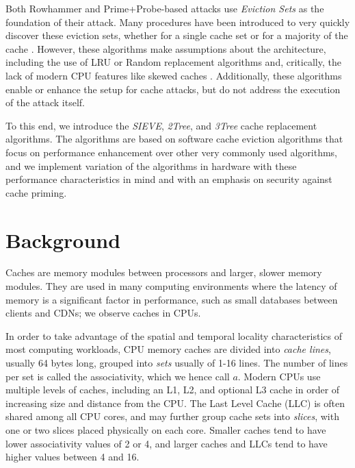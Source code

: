 \documentclass[letterpaper]{article}
\begin{document}
Both Rowhammer and Prime+Probe-based attacks use \textit{Eviction Sets}
as the foundation of their attack.
Many procedures have been introduced to very quickly discover these eviction sets,
whether for a single cache set \cite{TPFES}
or for a majority of the cache \cite{EvictionSetsAtScale}.
However, these algorithms make assumptions about the architecture,
including the use of LRU or Random replacement algorithms
and, critically, the lack of modern CPU features like skewed caches
\cite{EvictionSetsAtScale}.
Additionally, these algorithms enable or enhance the setup for cache attacks,
but do not address the execution of the attack itself.

To this end, we introduce the \textit{SIEVE}, \textit{2Tree}, and \textit{3Tree} cache replacement algorithms.
The algorithms are based on software cache eviction algorithms that focus on
performance enhancement over other very commonly used algorithms,
and we implement variation of the algorithms in hardware
with these performance characteristics in mind
and with an emphasis on security against cache priming.

\section{Background}

Caches are memory modules between processors and larger, slower memory modules.
They are used in many computing environments where the latency of memory
is a significant factor in performance,
such as small databases between clients and CDNs; we observe caches in CPUs.

In order to take advantage of the spatial and temporal locality characteristics
of most computing workloads,
CPU memory caches are divided into \textit{cache lines}, usually 64 bytes long,
grouped into \textit{sets} usually of 1-16 lines.
The number of lines per set is called the associativity, which we hence call $a$.
Modern CPUs use multiple levels of caches, including an L1, L2, and optional L3 cache
in order of increasing size and distance from the CPU.
The Last Level Cache (LLC) is often shared among all CPU cores, and may further group
cache sets into \textit{slices}, with one or two slices placed physically on each core.
Smaller caches tend to have lower associativity values of 2 or 4, and larger caches and LLCs
tend to have higher values between 4 and 16.
\end{document}
